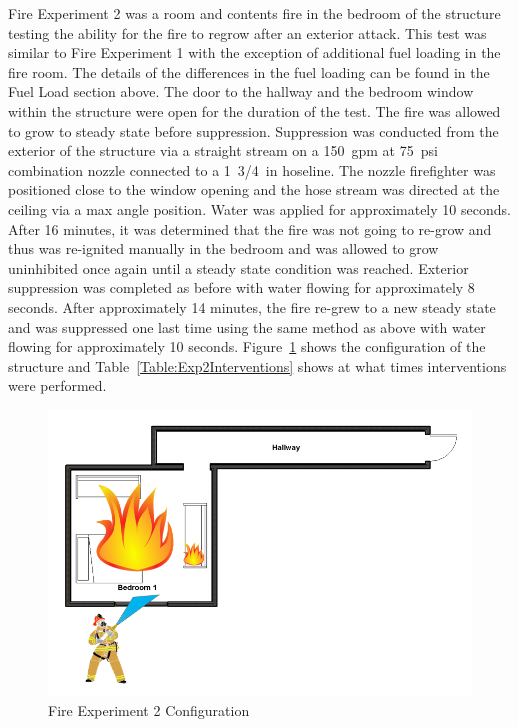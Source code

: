 \documentclass[12pt,oneside]{book}
\begin{document}
Fire Experiment 2 was a room and contents fire in the bedroom of the structure testing the ability for the fire to regrow after an exterior attack. This test was similar to Fire Experiment 1 with the exception of additional fuel loading in the fire room. The details of the differences in the fuel loading can be found in the Fuel Load section above. The door to the hallway and the bedroom window within the structure were open for the duration of the test. The fire was allowed to grow to steady state before suppression. Suppression was conducted from the exterior of the structure via a straight stream on a 150~gpm at 75~psi combination nozzle connected to a 1~3/4~in hoseline. The nozzle firefighter was positioned close to the window opening and the hose stream was directed at the ceiling via a max angle position. Water was applied for approximately 10 seconds. After 16 minutes, it was determined that the fire was not going to re-grow and thus was re-ignited manually in the bedroom and was allowed to grow uninhibited once again until a steady state condition was reached. Exterior suppression was completed as before with water flowing for approximately 8 seconds. After approximately 14 minutes, the fire re-grew to a new steady state and was suppressed one last time using the same method as above with water flowing for approximately 10 seconds. Figure~\ref{fig:Exp2Config} shows the configuration of the structure and Table~\ref{Table:Exp2Interventions} shows at what times interventions were performed.  


\begin{figure}[H]
	\centering
	\includegraphics[width=5in]{Howard_Exp_2.png}
	\caption{Fire Experiment 2 Configuration}
	\label{fig:Exp2Config}
\end{figure}
\end{document}
